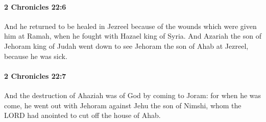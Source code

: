 		\paragraph{2 Chronicles 22:6} %
			\label{2CHRONICLES-22-6}

			And he returned to be healed in Jezreel because of the wounds which were given him at Ramah, when he fought with Hazael king of Syria. And Azariah the son of Jehoram king of Judah went down to see Jehoram the son of Ahab at Jezreel, because he was sick.


		\paragraph{2 Chronicles 22:7} %
			\label{2CHRONICLES-22-7}

			And the destruction of Ahaziah was of God by coming to Joram: for when he was come, he went out with Jehoram against Jehu the son of Nimshi, whom the LORD had anointed to cut off the house of Ahab.

